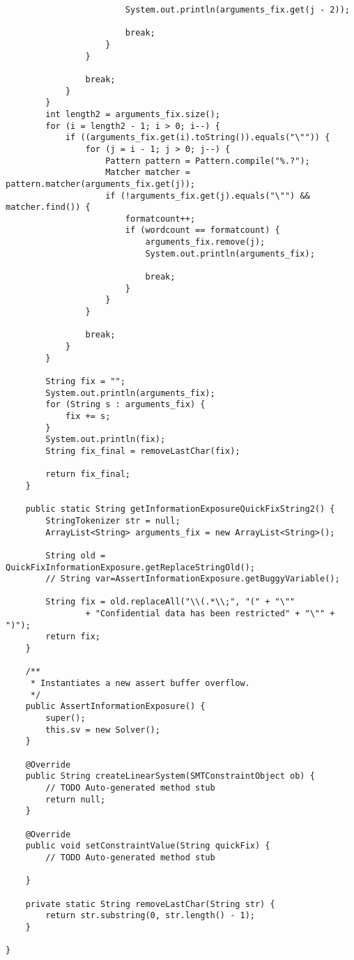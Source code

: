 \begin{lstlisting}
						System.out.println(arguments_fix.get(j - 2));

						break;
					}
				}

				break;
			}
		}
		int length2 = arguments_fix.size();
		for (i = length2 - 1; i > 0; i--) {
			if ((arguments_fix.get(i).toString()).equals("\"")) {
				for (j = i - 1; j > 0; j--) {
					Pattern pattern = Pattern.compile("%.?");
					Matcher matcher = pattern.matcher(arguments_fix.get(j));
					if (!arguments_fix.get(j).equals("\"") && matcher.find()) {
						formatcount++;
						if (wordcount == formatcount) {
							arguments_fix.remove(j);
							System.out.println(arguments_fix);

							break;
						}
					}
				}

				break;
			}
		}

		String fix = "";
		System.out.println(arguments_fix);
		for (String s : arguments_fix) {
			fix += s;
		}
		System.out.println(fix);
		String fix_final = removeLastChar(fix);

		return fix_final;
	}

	public static String getInformationExposureQuickFixString2() {
		StringTokenizer str = null;
		ArrayList<String> arguments_fix = new ArrayList<String>();

		String old = QuickFixInformationExposure.getReplaceStringOld();
		// String var=AssertInformationExposure.getBuggyVariable();

		String fix = old.replaceAll("\\(.*\\;", "(" + "\""
				+ "Confidential data has been restricted" + "\"" + ")");
		return fix;
	}

	/**
	 * Instantiates a new assert buffer overflow.
	 */
	public AssertInformationExposure() {
		super();
		this.sv = new Solver();
	}

	@Override
	public String createLinearSystem(SMTConstraintObject ob) {
		// TODO Auto-generated method stub
		return null;
	}

	@Override
	public void setConstraintValue(String quickFix) {
		// TODO Auto-generated method stub

	}

	private static String removeLastChar(String str) {
		return str.substring(0, str.length() - 1);
	}

}

\end{lstlisting}



